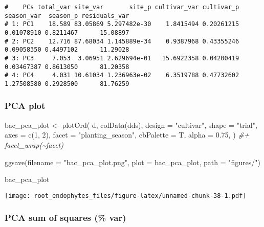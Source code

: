 \documentclass[
]{article}
\newenvironment{Shaded}{\begin{snugshade}}{\end{snugshade}}
\newcommand{\AttributeTok}[1]{\textcolor[rgb]{0.77,0.63,0.00}{#1}}
\newcommand{\CommentTok}[1]{\textcolor[rgb]{0.56,0.35,0.01}{\textit{#1}}}
\newcommand{\DecValTok}[1]{\textcolor[rgb]{0.00,0.00,0.81}{#1}}
\newcommand{\FloatTok}[1]{\textcolor[rgb]{0.00,0.00,0.81}{#1}}
\newcommand{\FunctionTok}[1]{\textcolor[rgb]{0.00,0.00,0.00}{#1}}
\newcommand{\NormalTok}[1]{#1}
\newcommand{\OtherTok}[1]{\textcolor[rgb]{0.56,0.35,0.01}{#1}}
\newcommand{\StringTok}[1]{\textcolor[rgb]{0.31,0.60,0.02}{#1}}
\begin{document}
\begin{verbatim}
#    PCs total_var site_var       site_p cultivar_var cultivar_p season_var  season_p residuals_var
# 1: PC1    18.589 83.05869 5.297482e-30    1.8415494 0.20261215 0.01078910 0.8211467      15.08897
# 2: PC2    12.716 87.68034 1.145889e-34    0.9387968 0.43355246 0.09058350 0.4497102      11.29028
# 3: PC3     7.053  3.06951 2.629694e-01   15.6922358 0.04200419 0.03467387 0.8613050      81.20358
# 4: PC4     4.031 10.61034 1.236963e-02    6.3519788 0.47732602 1.27508580 0.2928500      81.76259
\end{verbatim}

\hypertarget{pca-plot-1}{%
\subsubsection{PCA plot}\label{pca-plot-1}}

\begin{Shaded}
\begin{Highlighting}[]
\NormalTok{bac\_pca\_plot }\OtherTok{\textless{}{-}} \FunctionTok{plotOrd}\NormalTok{(}
\NormalTok{  d,}
  \FunctionTok{colData}\NormalTok{(dds),}
  \AttributeTok{design =} \StringTok{"cultivar"}\NormalTok{,}
  \AttributeTok{shape =} \StringTok{"trial"}\NormalTok{,}
  \AttributeTok{axes =} \FunctionTok{c}\NormalTok{(}\DecValTok{1}\NormalTok{, }\DecValTok{2}\NormalTok{),}
  \AttributeTok{facet =} \StringTok{"planting\_season"}\NormalTok{, }
  \AttributeTok{cbPalette =}\NormalTok{ T,}
  \AttributeTok{alpha =} \FloatTok{0.75}\NormalTok{,}
\NormalTok{) }\CommentTok{\#+ facet\_wrap(\textasciitilde{}facet) }

\FunctionTok{ggsave}\NormalTok{(}\AttributeTok{filename =} \StringTok{"bac\_pca\_plot.png"}\NormalTok{, }\AttributeTok{plot =}\NormalTok{ bac\_pca\_plot, }\AttributeTok{path =} \StringTok{"figures/"}\NormalTok{)}

\NormalTok{bac\_pca\_plot}
\end{Highlighting}
\end{Shaded}

\texttt{[image: root\_endophytes\_files/figure-latex/unnamed-chunk-38-1.pdf]}

\hypertarget{pca-sum-of-squares-var-1}{%
\subsubsection{PCA sum of squares (\%
var)}\label{pca-sum-of-squares-var-1}}
\end{document}
